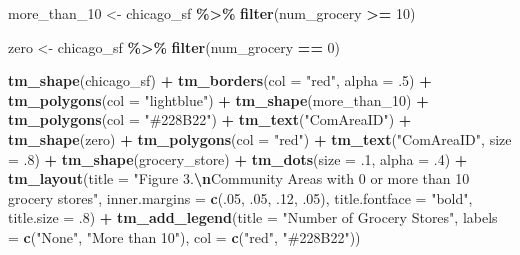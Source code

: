\documentclass[
]{article}
\newenvironment{Shaded}{\begin{snugshade}}{\end{snugshade}}
\newcommand{\AttributeTok}[1]{\textcolor[rgb]{0.13,0.29,0.53}{#1}}
\newcommand{\DecValTok}[1]{\textcolor[rgb]{0.00,0.00,0.81}{#1}}
\newcommand{\FunctionTok}[1]{\textcolor[rgb]{0.13,0.29,0.53}{\textbf{#1}}}
\newcommand{\NormalTok}[1]{#1}
\newcommand{\OtherTok}[1]{\textcolor[rgb]{0.56,0.35,0.01}{#1}}
\newcommand{\SpecialCharTok}[1]{\textcolor[rgb]{0.81,0.36,0.00}{\textbf{#1}}}
\newcommand{\StringTok}[1]{\textcolor[rgb]{0.31,0.60,0.02}{#1}}
\begin{document}
\begin{Shaded}
\begin{Highlighting}[]
\NormalTok{more\_than\_10 }\OtherTok{\textless{}{-}}\NormalTok{ chicago\_sf }\SpecialCharTok{\%\textgreater{}\%}
  \FunctionTok{filter}\NormalTok{(num\_grocery }\SpecialCharTok{\textgreater{}=} \DecValTok{10}\NormalTok{) }
  
\NormalTok{zero }\OtherTok{\textless{}{-}}\NormalTok{ chicago\_sf }\SpecialCharTok{\%\textgreater{}\%}
  \FunctionTok{filter}\NormalTok{(num\_grocery }\SpecialCharTok{==} \DecValTok{0}\NormalTok{)}

\FunctionTok{tm\_shape}\NormalTok{(chicago\_sf) }\SpecialCharTok{+}
  \FunctionTok{tm\_borders}\NormalTok{(}\AttributeTok{col =} \StringTok{"red"}\NormalTok{, }\AttributeTok{alpha =}\NormalTok{ .}\DecValTok{5}\NormalTok{) }\SpecialCharTok{+}
  \FunctionTok{tm\_polygons}\NormalTok{(}\AttributeTok{col =} \StringTok{"lightblue"}\NormalTok{) }\SpecialCharTok{+}
  \FunctionTok{tm\_shape}\NormalTok{(more\_than\_10) }\SpecialCharTok{+}
  \FunctionTok{tm\_polygons}\NormalTok{(}\AttributeTok{col =} \StringTok{"\#228B22"}\NormalTok{) }\SpecialCharTok{+}
  \FunctionTok{tm\_text}\NormalTok{(}\StringTok{"ComAreaID"}\NormalTok{) }\SpecialCharTok{+}
  \FunctionTok{tm\_shape}\NormalTok{(zero) }\SpecialCharTok{+}
  \FunctionTok{tm\_polygons}\NormalTok{(}\AttributeTok{col =} \StringTok{"red"}\NormalTok{) }\SpecialCharTok{+}
  \FunctionTok{tm\_text}\NormalTok{(}\StringTok{"ComAreaID"}\NormalTok{, }\AttributeTok{size =}\NormalTok{ .}\DecValTok{8}\NormalTok{) }\SpecialCharTok{+}
  \FunctionTok{tm\_shape}\NormalTok{(grocery\_store) }\SpecialCharTok{+}
  \FunctionTok{tm\_dots}\NormalTok{(}\AttributeTok{size =}\NormalTok{ .}\DecValTok{1}\NormalTok{, }\AttributeTok{alpha =}\NormalTok{ .}\DecValTok{4}\NormalTok{) }\SpecialCharTok{+}
  \FunctionTok{tm\_layout}\NormalTok{(}\AttributeTok{title =} \StringTok{"Figure 3.}\SpecialCharTok{\textbackslash{}n}\StringTok{Community Areas with 0 or more than 10 grocery stores"}\NormalTok{,}
            \AttributeTok{inner.margins =} \FunctionTok{c}\NormalTok{(.}\DecValTok{05}\NormalTok{, .}\DecValTok{05}\NormalTok{, .}\DecValTok{12}\NormalTok{, .}\DecValTok{05}\NormalTok{),}
            \AttributeTok{title.fontface =} \StringTok{"bold"}\NormalTok{,}
            \AttributeTok{title.size =}\NormalTok{ .}\DecValTok{8}\NormalTok{) }\SpecialCharTok{+}
  \FunctionTok{tm\_add\_legend}\NormalTok{(}\AttributeTok{title =} \StringTok{"Number of Grocery Stores"}\NormalTok{,}
                \AttributeTok{labels =} \FunctionTok{c}\NormalTok{(}\StringTok{"None"}\NormalTok{,}
                           \StringTok{"More than 10"}\NormalTok{),}
                \AttributeTok{col =} \FunctionTok{c}\NormalTok{(}\StringTok{"red"}\NormalTok{, }\StringTok{"\#228B22"}\NormalTok{))}
\end{Highlighting}
\end{Shaded}
\end{document}
